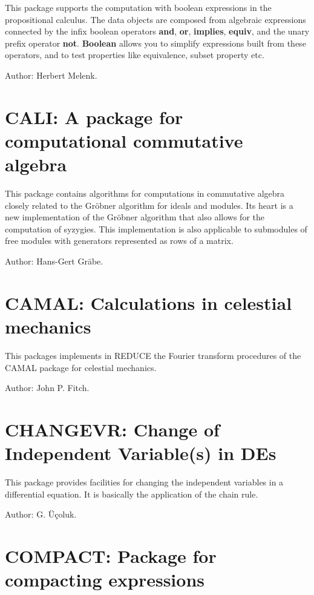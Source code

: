 This package supports the computation with boolean expressions in the
propositional calculus.  The data objects are composed from algebraic
expressions connected by the infix boolean operators {\bf and}, {\bf or},
{\bf implies}, {\bf equiv}, and the unary prefix operator {\bf not}.
{\bf Boolean} allows you to simplify expressions built from these
operators, and to test properties like equivalence, subset property etc.

Author: Herbert Melenk.

\section{CALI: A package for computational commutative algebra}

This package contains algorithms for computations in commutative algebra
closely related to the Gr\"obner algorithm for ideals and modules.  Its
heart is a new implementation of the Gr\"obner algorithm that also allows
for the computation of syzygies.  This implementation is also applicable to
submodules of free modules with generators represented as rows of a matrix.

Author: Hans-Gert Gr\"abe.

\section{CAMAL: Calculations in celestial mechanics} 

This packages implements in REDUCE the Fourier transform procedures of the
CAMAL package for celestial mechanics.

Author: John P. Fitch.

\section{CHANGEVR: Change of Independent Variable(s) in DEs}

This package provides facilities for changing the independent variables in
a differential equation. It is basically the application of the chain rule.

Author: G. \"{U}\c{c}oluk.

\section{COMPACT: Package for compacting expressions} 

